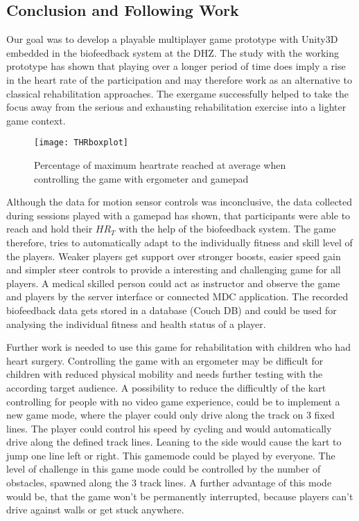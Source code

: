 \begin{multicols}{2}
\section{Conclusion and Following Work}
Our goal was to develop a playable multiplayer game prototype with Unity3D embedded in the biofeedback system at the DHZ. The study with the working prototype has shown that playing over a longer period of time does imply a rise in the heart rate of the participation and may therefore work as an alternative to classical rehabilitation approaches. The exergame successfully helped to take the focus away from the serious and exhausting rehabilitation exercise into a lighter game context. 
\begin{figure}[H]
  \centering
    \texttt{[image: THRboxplot]}
 \caption{Percentage of maximum heartrate reached at average when controlling the game with ergometer and gamepad}
\end{figure}
Although the data for motion sensor controls was inconclusive, the data collected during sessions played with a gamepad has shown, that participants were able to reach and hold their $HR_T$ with the help of the biofeedback system.
The game therefore, tries to automatically adapt to the individually fitness and skill level of the players. Weaker players get support over stronger boosts, easier speed gain and simpler steer controls to provide a interesting and challenging game for all players. A medical skilled person could act as instructor and observe the game and players by the server interface or connected MDC application. The recorded biofeedback data gets stored in a database (Couch DB) and could be used for analysing the individual fitness and health status of a player.

Further work is needed to use this game for rehabilitation with children who had heart surgery. Controlling the game with an ergometer may be difficult for children with reduced physical mobility and needs further testing with the according target audience. A possibility to reduce the difficultly of the kart controlling for people with no video game experience, could be to implement a new game mode, where the player could only drive along the track on 3 fixed lines. The player could control his speed by cycling and would automatically drive along the defined track lines. Leaning to the side would cause the kart to jump one line left or right. This gamemode could be played by everyone. The level of challenge in this game mode could be controlled by the number of obstacles, spawned along the 3 track lines. A further advantage of this mode would be, that the game won't be permanently interrupted, because players can't drive against walls or get stuck anywhere.


\end{multicols}
